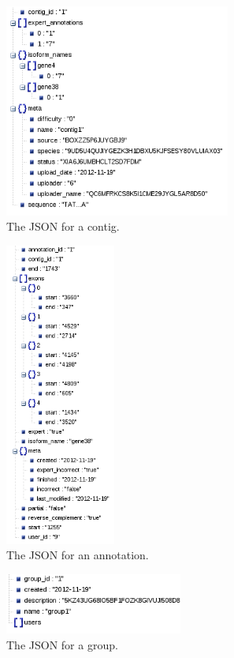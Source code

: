 \documentclass[]{IEEEtran}
\begin{document}
\begin{figure}%
	\includegraphics[height=70mm]{contig.png}
	\caption{The JSON for a contig.}
	\label{fig:JSON-contig}
\end{figure}%

\begin{figure}%
	\includegraphics[height=100mm]{annotation.png}
	\caption{The JSON for an annotation.}
	\label{fig:JSON-annotation}
\end{figure}%

\begin{figure}%
	\includegraphics[height=20mm]{group.png}
	\caption{The JSON for a group.}
	\label{fig:JSON-group}
\end{figure}%
\end{document}

